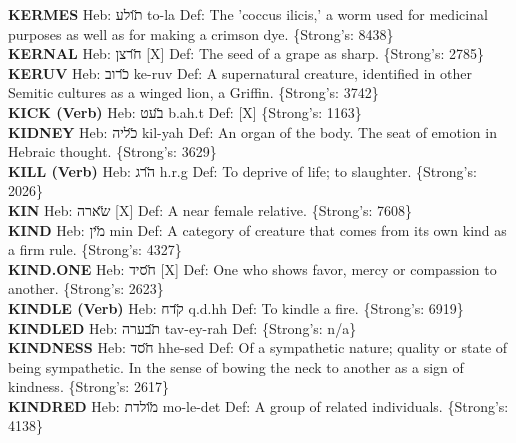 {\textbf{KERMES} Heb: {\large\H תולע} to-la Def: The 'coccus ilicis,' a worm used for medicinal purposes as well as for making a crimson dye. \{Strong's: 8438\}\hfill{}\\

\textbf{KERNAL} Heb: {\large\H חרצן} {[}X{]} Def: The seed of a grape as sharp. \{Strong's: 2785\}\hfill{}\\

\textbf{KERUV} Heb: {\large\H כרוב} ke-ruv Def: A supernatural creature, identified in other Semitic cultures as a winged lion, a Griffin. \{Strong's: 3742\}\hfill{}\\

\textbf{KICK (Verb)} Heb: {\large\H בעט} b.ah.t Def: {[}X{]} \{Strong's: 1163\}\hfill{}\\

\textbf{KIDNEY} Heb: {\large\H כליה} kil-yah Def: An organ of the body. The seat of emotion in Hebraic thought. \{Strong's: 3629\}\hfill{}\\

\textbf{KILL (Verb)} Heb: {\large\H הרג} h.r.g Def: To deprive of life; to slaughter. \{Strong's: 2026\}\hfill{}\\

\textbf{KIN} Heb: {\large\H שארה} {[}X{]} Def: A near female relative. \{Strong's: 7608\}\hfill{}\\

\textbf{KIND} Heb: {\large\H מין} min Def: A category of creature that comes from its own kind as a firm rule. \{Strong's: 4327\}\hfill{}\\

\textbf{KIND.ONE} Heb: {\large\H חסיד} {[}X{]} Def: One who shows favor, mercy or compassion to another. \{Strong's: 2623\}\hfill{}\\

\textbf{KINDLE (Verb)} Heb: {\large\H קדח} q.d.hh Def: To kindle a fire. \{Strong's: 6919\}\hfill{}\\

\textbf{KINDLED} Heb: {\large\H תבערה} tav-ey-rah Def: \{Strong's: n/a\}\hfill{}\\

\textbf{KINDNESS} Heb: {\large\H חסד} hhe-sed Def: Of a sympathetic nature; quality or state of being sympathetic. In the sense of bowing the neck to another as a sign of kindness. \{Strong's: 2617\}\hfill{}\\

\textbf{KINDRED} Heb: {\large\H מולדת} mo-le-det Def: A group of related individuals. \{Strong's: 4138\}\hfill{}\\

}
